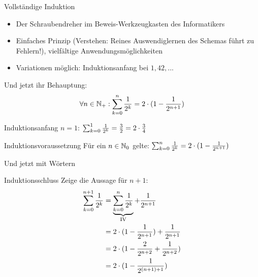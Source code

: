 \begin{frame}{Vollständige Induktion}
	\begin{itemize}
		\item Der Schraubendreher im Beweis-Werkzeugkasten des Informatikers
		\item Einfaches Prinzip (Verstehen: Reines Auswendiglernen des Schemas führt zu Fehlern!), vielfältige Anwendungsmöglichkeiten
		\item Variationen möglich: Induktionsanfang bei $1, 42, ...$
	\end{itemize}
	
\end{frame}




\begin{frame}{Und jetzt ihr}
	Behauptung: \[\forall n \in \mathbb{N}_+ : \sum_{k=0}^{n}{\frac{1}{2^k}} = 2 \cdot (1 - \frac{1}{2^{n+1}})\]
	\begin{block}{Induktionsanfang}
		$n = 1$: $\sum_{k=0}^{1}{\frac{1}{2^k}} = \frac{3}{2} = 2 \cdot \frac{3}{4}$ \checked
	\end{block}
	\begin{block}{Induktionsvoraussetzung}
		Für ein $n \in \mathbb{N}_0$ gelte: $\sum_{k=0}^{n}{\frac{1}{2^k}} = 2 \cdot (1 - \frac{1}{2^{n+1}})$
	\end{block}
\end{frame}

\begin{frame}{Und jetzt mit Wörtern}

	\begin{block}{Induktionsschluss}
		Zeige die Aussage für $n+1$:\\
		\begin{align*}
			\sum_{k=0}^{n+1}{\frac{1}{2^k}}
				&= \underbrace{\sum_{k=0}^{n}{\frac{1}{2^k}}}_{\text{IV}} + \frac{1}{2^{n+1}}\\
				&= 2 \cdot (1 - \frac{1}{2^{n+1}}) + \frac{1}{2^{n+1}}\\
				&= 2 \cdot (1 - \frac{2}{2^{n+2}} + \frac{1}{2^{n+2}})\\
				&= 2 \cdot (1 - \frac{1}{2^{(n+1)+1}})
		\end{align*}
	\end{block}
\end{frame}

